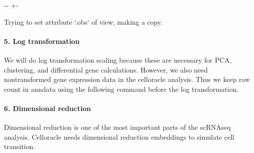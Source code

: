 \documentclass[letterpaper,10pt,english]{sphinxmanual}
\newlength\nbsphinxcodecellspacing
\begin{document}
{

\kern-\sphinxverbatimsmallskipamount\kern-\baselineskip
\kern+\FrameHeightAdjust\kern-\fboxrule
\vspace{\nbsphinxcodecellspacing}

\begin{sphinxVerbatim}[commandchars=\\\{\}]
Trying to set attribute `.obs` of view, making a copy.
\end{sphinxVerbatim}
}


\paragraph{5. Log transformation}
\label{\detokenize{notebooks/03_scRNA-seq_data_preprocessing/scanpy_preprocessing_with_Paul_etal_2015_data:5.-Log-transformation}}
We will do log transformation scaling because these are necessary for PCA, clustering, and differential gene calculations. However, we also need non\sphinxhyphen{}transformed gene expression data in the celloracle analysis. Thus we keep raw count in anndata using the following command before the log transformation.

{
\begin{sphinxVerbatim}[commandchars=\\\{\}]
\llap{\color{nbsphinxin}[7]:\,\hspace{\fboxrule}\hspace{\fboxsep}}
  

\end{sphinxVerbatim}
}


\paragraph{6. Dimensional reduction}
\label{\detokenize{notebooks/03_scRNA-seq_data_preprocessing/scanpy_preprocessing_with_Paul_etal_2015_data:6.-Dimensional-reduction}}
Dimensional reduction is one of the most important parts of the scRNA\sphinxhyphen{}seq analysis. Celloracle needs dimensional reduction embeddings to simulate cell transition.
\end{document}
